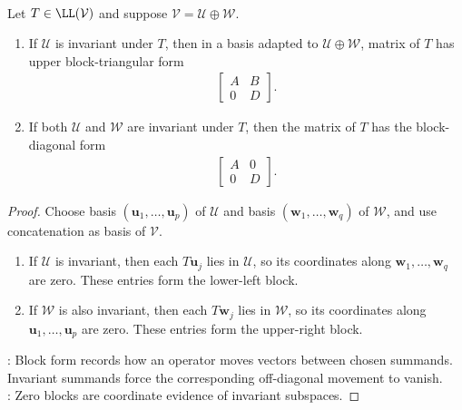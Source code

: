 \begin{proposition} \label{prop:invariant-subspaces-and-block-form} \\
Let $T \in \LL(\mathcal{V})$ and suppose $\mathcal{V} = \mathcal{U} \oplus \mathcal{W}$.
\begin{enumerate}[label=(\roman*)]
\setlength{\itemsep}{0pt}
\item If $\mathcal{U}$ is invariant under $T$, then in a basis adapted to $\mathcal{U} \oplus \mathcal{W}$, matrix of $T$ has upper block-triangular form
\begin{align}
\begin{bmatrix}
A & B \\
0 & D
\end{bmatrix}. \nonumber
\end{align}
\item If both $\mathcal{U}$ and $\mathcal{W}$ are invariant under $T$, then the matrix of $T$ has the block-diagonal form
\begin{align}
\begin{bmatrix}
A & 0 \\
0 & D
\end{bmatrix}. \nonumber
\end{align}
\end{enumerate}
\begin{proof}
Choose basis $(\mathbf{u}_1,\ldots,\mathbf{u}_p)$ of $\mathcal{U}$ and basis $(\mathbf{w}_1,\ldots,\mathbf{w}_q)$ of $\mathcal{W}$, and use concatenation as basis of $\mathcal{V}$.
\begin{enumerate}[label=(\roman*)]
\setlength{\itemsep}{0pt}
\item If $\mathcal{U}$ is invariant, then each $T\mathbf{u}_j$ lies in $\mathcal{U}$, so its coordinates along $\mathbf{w}_1,\ldots,\mathbf{w}_q$ are zero. These entries form the lower-left block.
\item If $\mathcal{W}$ is also invariant, then each $T\mathbf{w}_j$ lies in $\mathcal{W}$, so its coordinates along $\mathbf{u}_1,\ldots,\mathbf{u}_p$ are zero. These entries form the upper-right block.
\end{enumerate}
: Block form records how an operator moves vectors between chosen summands. Invariant summands force the corresponding off-diagonal movement to vanish.\\
: Zero blocks are coordinate evidence of invariant subspaces.
\end{proof}
\end{proposition}


